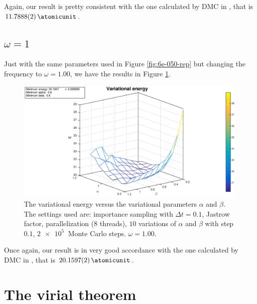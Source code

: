 \documentclass[a4paper,twoside,11pt]{book}
\begin{document}
Again, our result is pretty consistent with the one calculated by DMC in \cite{PedersenLohne2011}, that is $\SI{11.7888 \pm 0.0002}{\atomicunit}$.

\section{$\omega = 1$}

Just with the same parameters used in Figure \ref{fig:6e-050-rep} but changing the frequency to $\omega=1.00$, we have the results in Figure \ref{fig:6e-100-rep}.
\begin{figure}[H]
	\centering
	\includegraphics[width=\textwidth]{6e-100-rep}
	\caption{The variational energy versus the variational parameters $\alpha$ and $\beta$. The settings used are: importance sampling with $\Delta t = 0.1$, Jastrow factor, parallelization (8 threads), $10$ variations of $\alpha$ and $\beta$ with step $0.1$, $\SI{2e5}{}$ Monte Carlo steps. $\omega=1.00$.}
	\label{fig:6e-100-rep}
\end{figure}

Once again, our result is in very good accordance with the one calculated by DMC in \cite{PedersenLohne2011}, that is $\SI{20.1597 \pm 0.0002}{\atomicunit}$.




\chapter{The virial theorem}
\label{sec:virial}
\end{document}
